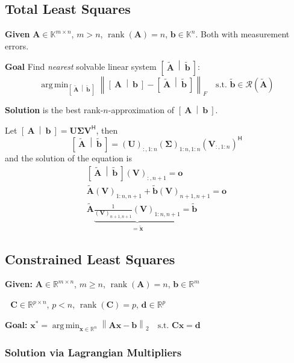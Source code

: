 \documentclass[a4paper,11pt]{extarticle}
\newcommand{\K}{\mathbb{K}}
\newcommand{\R}{\mathbb{R}}
\newcommand{\cR}{\mathcal{R}}
\newcommand{\norm}[1]{\left\lVert #1 \right\rVert}
\newcommand{\linsys}[2]{\left[\ #1 \ \middle| \ #2 \ \right]}
\newcommand*{\Hm}{\mathsf{H}}
\DeclareMathOperator{\rank}{rank}
\DeclareMathOperator*{\argmin}{arg\,min}
\newcommand{\mat}[1]{\mathbf{#1}}
\renewcommand{\vec}[1]{\mathbf{#1}}
\newcommand{\vb}{\vec{b}}
\newcommand{\vd}{\vec{d}}
\newcommand{\vo}{\vec{o}}
\newcommand{\vx}{\vec{x}}
\newcommand{\vtb}{\widetilde{\vec{b}}}
\newcommand{\vtx}{\widetilde{\vec{x}}}
\newcommand{\MA}{\mat{A}}
\newcommand{\MC}{\mat{C}}
\newcommand{\MU}{\mat{U}}
\newcommand{\MV}{\mat{V}}
\newcommand{\MtA}{\widetilde{\mat{A}}}
\newcommand{\MSigma}{\mat{\Sigma}}
\begin{document}
\begin{multicols*}{2}
\subsection{Total Least Squares}

\textbf{Given} $\MA\in\K^{m\times n}$, $m>n$, $\rank(\MA)=n$, $\vb\in\K^n$. Both
with measurement errors.

\textbf{Goal} Find \emph{nearest} solvable linear system
$\linsys{\MtA}{\vtb}$:
\[
\argmin_{\linsys{\MtA}{\vtb}}
\norm{\linsys{\MA}{\vb}-\linsys{\MtA}{\vtb}}_F
\quad
\text{s.t. }\vtb\in\cR(\MtA)
\]

\textbf{Solution} is the best rank-$n$-approximation of $\linsys{\MA}{\vb}$.

Let $\linsys{\MA}{\vb}=\MU\MSigma\MV^\Hm$, then
\[
\linsys{\MtA}{\vtb}=(\MU)_{:,1:n}(\MSigma)_{1:n,1:n}(\MV_{:,1:n})^\Hm
\]
and the solution of the equation is
\begin{align*}
\linsys{\MtA}{\vtb}(\MV)_{:,n+1}=\vo\\
\MtA(\MV)_{1:n,n+1} + \vtb(\MV)_{n+1,n+1}=\vo\\
\MtA\underbrace{\frac{1}{(\MV)_{n+1,n+1}}(\MV)_{1:n,n+1}}_{=\vtx}=\vtb
\end{align*}

\subsection{Constrained Least Squares}

\textbf{Given:} $\MA\in\R^{m\times n}$, $m\geq n$, $\rank(\MA)=n$, $\vb\in\R^m$

\qquad \quad\,\, $\MC\in\R^{p\times n}$, $p<n$, $\rank(\MC)=p$, $\vd\in\R^p$

\textbf{Goal:}
$
\vx^*=\argmin_{\vx\in\R^n} \norm{\MA\vx-\vb}_2 \quad\text{s.t. }\MC\vx=\vd
$

\subsubsection{Solution via Lagrangian Multipliers}


\end{multicols*}
\end{document}
